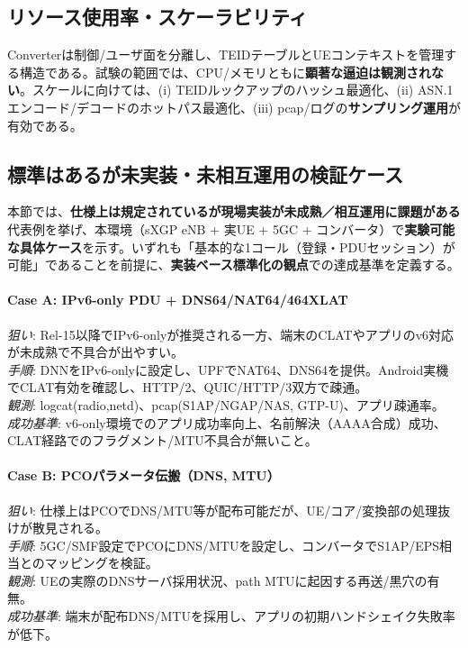 \subsection{リソース使用率・スケーラビリティ}
Converterは制御/ユーザ面を分離し、TEIDテーブルとUEコンテキストを管理する構造である。試験の範囲では、CPU/メモリともに\textbf{顕著な逼迫は観測されない}。スケールに向けては、(i) TEIDルックアップのハッシュ最適化、(ii) ASN.1エンコード/デコードのホットパス最適化、(iii) pcap/ログの\textbf{サンプリング運用}が有効である。

\subsection{標準はあるが未実装・未相互運用の検証ケース}
本節では、\textbf{仕様上は規定されているが現場実装が未成熟／相互運用に課題がある}代表例を挙げ、本環境（sXGP eNB + 実UE + 5GC + コンバータ）で\textbf{実験可能な具体ケース}を示す。いずれも「基本的な1コール（登録・PDUセッション）が可能」であることを前提に、\textbf{実装ベース標準化の観点}での達成基準を定義する。

\paragraph{Case A: IPv6-only PDU + DNS64/NAT64/464XLAT}
\textit{狙い}: Rel-15以降でIPv6-onlyが推奨される一方、端末のCLATやアプリのv6対応が未成熟で不具合が出やすい。\\
\textit{手順}: DNNをIPv6-onlyに設定し、UPFでNAT64、DNS64を提供。Android実機でCLAT有効を確認し、HTTP/2、QUIC/HTTP/3双方で疎通。\\
\textit{観測}: logcat(radio,netd)、pcap(S1AP/NGAP/NAS, GTP-U)、アプリ疎通率。\\
\textit{成功基準}: v6-only環境でのアプリ成功率向上、名前解決（AAAA合成）成功、CLAT経路でのフラグメント/MTU不具合が無いこと。

\paragraph{Case B: PCOパラメータ伝搬（DNS, MTU）}
\textit{狙い}: 仕様上はPCOでDNS/MTU等が配布可能だが、UE/コア/変換部の処理抜けが散見される。\\
\textit{手順}: 5GC/SMF設定でPCOにDNS/MTUを設定し、コンバータでS1AP/EPS相当とのマッピングを検証。\\
\textit{観測}: UEの実際のDNSサーバ採用状況、path MTUに起因する再送/黒穴の有無。\\
\textit{成功基準}: 端末が配布DNS/MTUを採用し、アプリの初期ハンドシェイク失敗率が低下。


